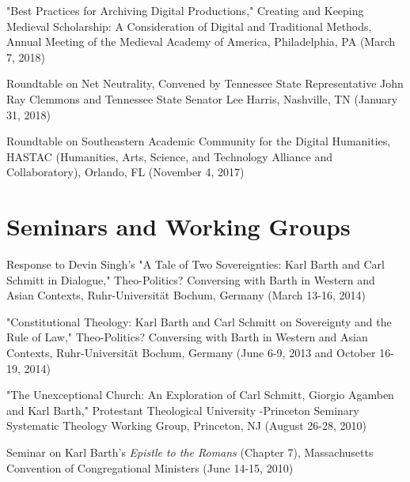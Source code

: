 \documentclass[]{res} %
\begin{document}
\begin{resume}
\begin{hangparas}{.25in}{1}"Best Practices for Archiving Digital Productions," Creating and Keeping Medieval Scholarship: A Consideration of Digital and Traditional Methods, Annual Meeting of the Medieval Academy of America, Philadelphia, PA (March 7, 2018)\end{hangparas}

\begin{hangparas}{.25in}{1}Roundtable on Net Neutrality, Convened by Tennessee State Representative John Ray Clemmons and Tennessee State Senator Lee Harris, Nashville, TN (January 31, 2018)\end{hangparas}

\begin{hangparas}{.25in}{1}Roundtable on Southeastern Academic Community for the Digital Humanities, HASTAC (Humanities, Arts, Science, and Technology Alliance and Collaboratory), Orlando, FL (November 4, 2017)\end{hangparas}

\section{Seminars and Working Groups}

\begin{hangparas}{.25in}{1}Response to Devin Singh’s "A Tale of Two Sovereignties: Karl Barth and Carl Schmitt in Dialogue," Theo-Politics? Conversing with Barth in Western and Asian Contexts, Ruhr-Universität Bochum, Germany (March 13-16, 2014)\end{hangparas}

\begin{hangparas}{.25in}{1}"Constitutional Theology: Karl Barth and Carl Schmitt on Sovereignty and the Rule of Law," Theo-Politics? Conversing with Barth in Western and Asian Contexts, Ruhr-Universität Bochum, Germany (June 6-9, 2013 and October 16-19, 2014)\end{hangparas}

\begin{hangparas}{.25in}{1}"The Unexceptional Church: An Exploration of Carl Schmitt, Giorgio Agamben and Karl Barth," Protestant Theological University -Princeton Seminary Systematic Theology Working Group, Princeton, NJ (August 26-28, 2010)\end{hangparas}

\begin{hangparas}{.25in}{1}Seminar on Karl Barth’s \textit{Epistle to the Romans} (Chapter 7), Massachusetts Convention of Congregational Ministers (June 14-15, 2010)\end{hangparas}


\end{resume}
\end{document}
